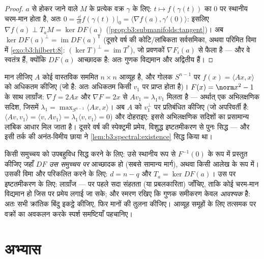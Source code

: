 \begin{proof}
$a$ से होकर जाने वाले $M$ के प्रत्येक वक्र $\gamma$ के लिए:
$t \mapsto
f(\gamma(t))$ का $0$ पर स्थानीय चरम-मान होता है, अतः $0 =
\frac{\dd}{\dd t}f(\gamma(t))\big|_0 = \langle\nabla f(a),
\gamma'(0)\rangle$: इसलिए $\nabla f(a) \perp T_aM = \ker DF(a)$
(\cref{prop:b3:submanifolds:tangent})। अब $\ker DF(a)^\perp
= \operatorname{im}DF(a)^{\mathsf T}$ (दूसरे वर्ष की कोटि/लांबिकता सर्वसमिका, अथवा
परिमित विमा में \cref{exo:b3:hilbert:8}: $(\ker T)^\perp = \operatorname{im}T^*$), जो प्रवणकों $\nabla F_i(a)$ से फैला है ---
और वे स्वतंत्र हैं, क्योंकि $DF(a)$ आच्छादक है: अतः गुणक विद्यमान
और अद्वितीय हैं।
\end{proof}

\begin{example}[स्पेक्ट्रमी प्रमेय, ज्यामितीय रूप से]
\label{ex:b3:submanifolds:rayleigh}
मान लीजिए $A$ कोई वास्तविक सममित $n\times n$ आव्यूह है, और गोलक
$S^{n-1}$ पर $f(x) = \langle Ax, x\rangle$ को अधिकतम कीजिए (जो  है: अतः अधिकतम किसी
$v_1$ पर प्राप्त होता है)। $F(x) = \norm x^2 - 1$ के साथ लाग्राँज: $\nabla f = 2Ax$ और $\nabla F =
2x$
से $Av_1 = \lambda_1v_1$ मिलता है --- अर्थात् एक अभिलक्षणिक सदिश, जिसमें $\lambda_1 = \max_{S^{n-1}}\langle Ax, x\rangle$।
अब $A$ को $v_1^\perp$ पर प्रतिबंधित कीजिए (जो अपरिवर्ती है: $\langle Av, v_1\rangle =
\langle v, Av_1\rangle = \lambda_1\langle v, v_1\rangle = 0$)
और दोहराइए: इससे अभिलक्षणिक सदिशों का प्रसामान्य लांबिक आधार मिल
जाता है। दूसरे वर्ष की स्पेक्ट्रमी प्रमेय, विशुद्ध इष्टतमीकरण से
पुनः सिद्ध --- और इसी तर्क की अनंत-विमीय छाया ने \cref{lem:b3:spectral:existence} सिद्ध किया
था।
\end{example}

\begin{method}\label{met:b3:submanifolds:method}
किसी समुच्चय को उपबहुविध सिद्ध करने के लिए: उसे स्थानीय रूप से
$F^{-1}(0)$ के रूप में प्रस्तुत कीजिए जहाँ $DF$ \emph{उस समुच्चय पर}
आच्छादक हो (सबसे सामान्य मार्ग), अथवा किसी आलेख के रूप में। उसकी
विमा और  परिकलित करने के लिए: $d = n - q$ और $T_a = \ker DF(a)$। उस पर
इष्टतमीकरण के लिए: लाग्राँज --- पर पहले सदा संहतता (या
प्रबलकारिता) जाँचिए, ताकि कोई चरम-मान विद्यमान हो जिस पर प्रमेय
लगाई जा सके; और स्मरण रखिए कि गुणक समीकरण केवल \emph{आवश्यक} है:
अतः सभी क्रांतिक बिंदु इकट्ठे कीजिए, फिर मानों की तुलना कीजिए।
आव्यूह समूहों के लिए तत्समक पर वक्रों का अवकलन करके स्पर्श
समष्टियाँ पहचानिए।
\end{method}

\section{अभ्यास}

